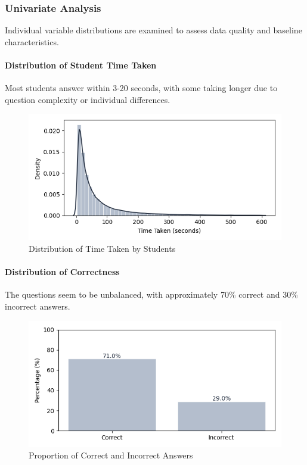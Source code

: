 \documentclass[
    a4paper, %
    10pt, %
    twoside, %
]{LTJournalArticle}
\begin{document}
\subsubsection{Univariate Analysis}
Individual variable distributions are examined to assess data quality and baseline characteristics.

\paragraph{Distribution of Student Time Taken}
Most students answer within 3-20 seconds, with some taking longer due to question complexity or individual differences.

\begin{figure}[H]
    \centering
    \includegraphics[width=\columnwidth]{images/time_distribution.png}
    \caption{Distribution of Time Taken by Students}
    \label{fig:time-distribution}
\end{figure}

\paragraph{Distribution of Correctness}
The questions seem to be unbalanced, with approximately 70\% correct and 30\% incorrect answers.

\begin{figure}[H]
    \centering
    \includegraphics[width=\columnwidth]{images/correct_incorrect_dist.png}
    \caption{Proportion of Correct and Incorrect Answers}
    \label{fig:correct-incorrect-dist}
\end{figure}
\end{document}
